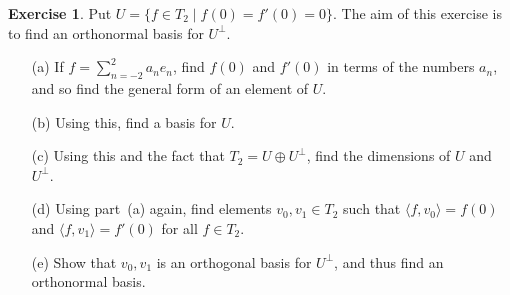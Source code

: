 \documentclass{amsart}
\newcommand{\st}        {\;|\;}
\newcommand{\ip}[1]     {\langle #1\rangle}
\newcommand{\op}        {\oplus}
\renewcommand{\:}       {\colon}
\theoremstyle{definition}
\newtheorem{exercise}{Exercise}[section]
\begin{document}
\begin{exercise}
 Put $U=\{f\in T_2\st f(0)=f'(0)=0\}$.  The aim of this exercise is to
 find an orthonormal basis for $U^\perp$.
 \begin{itemize}
  \item[(a)] If $f=\sum_{n=-2}^2a_ne_n$, find $f(0)$ and $f'(0)$ in
   terms of the numbers $a_n$, and so find the general form of an
   element of $U$.
  \item[(b)] Using this, find a basis for $U$.
  \item[(c)] Using this and the fact that $T_2=U\op U^\perp$, find the
   dimensions of $U$ and $U^\perp$.
  \item[(d)] Using part~(a) again, find elements $v_0,v_1\in T_2$ such
   that $\ip{f,v_0}=f(0)$ and $\ip{f,v_1}=f'(0)$ for all $f\in T_2$. 
  \item[(e)] Show that $v_0,v_1$ is an orthogonal basis for $U^\perp$,
   and thus find an orthonormal basis.
 \end{itemize}
\end{exercise}
\end{document}
